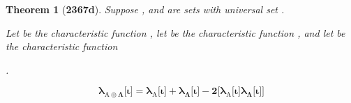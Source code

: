 \documentclass[preview]{standalone}
\newtheorem{theorem}{Theorem}
\begin{document}
\begin{theorem}[\textbf{2367d}]
    Suppose , and \bm{$\Lambda$} are sets with universal set \bm{$\Omega$}. 
    \begin{center}
        Let  be the characteristic function 
        ,
        let  be the characteristic function 
        , 
        and let \bm{$\lambda_{\Lambda}$} be the characteristic function  
        \raggedright {}.
    \end{center}
    \begin{equation*}
        \bm{
            \lambda_{\mathrm{A} \oplus \Lambda} \big[ \iota \big]
                = 
            \lambda_{\mathrm{A}} \big[ \iota \big] 
                + 
            \lambda_{\Lambda} \big[ \iota \big] 
                - 
            2 \Big[ \lambda_{\mathrm{A}} \big[ \iota \big] \lambda_{\Lambda} \big[ \iota \big] \Big]
        }
    \end{equation*}
\end{theorem}
\end{document}
